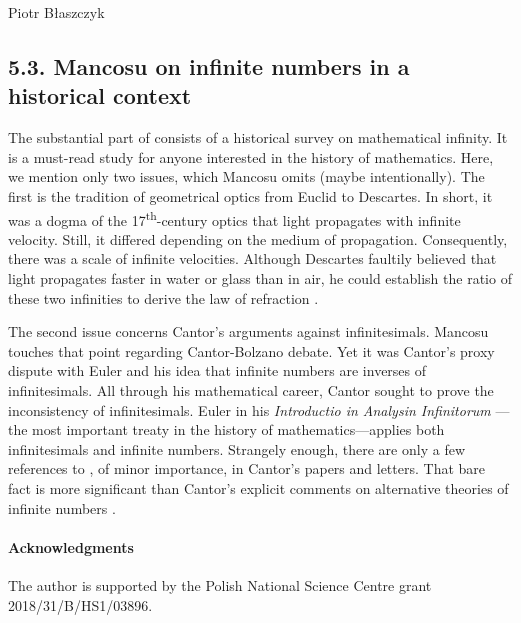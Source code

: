 \begin{artengenv}{Piotr Błaszczyk}
\subsection{5.3. Mancosu on infinite numbers in a historical context}

The substantial part of \parencite{ref_pm09} consists of a historical survey on mathematical infinity. It is a must-read study for anyone interested in the history of mathematics.  Here, we mention only two issues, which Mancosu omits (maybe intentionally). The first is the tradition of geometrical optics from Euclid to Descartes. In short, it was a dogma of the 17\textsuperscript{th}-century optics that light propagates with infinite velocity. Still, it differed depending on the medium of propagation. 
Consequently, there
was a scale of infinite velocities. Although Descartes faultily believed that light propagates
faster in water or glass than in air, he could establish the ratio of these two
infinities to derive the law of refraction \parencite[see][]{ref_pb20}.

The second issue concerns Cantor's arguments against infinitesimals. Mancosu touches that point regarding Cantor-Bolzano debate. Yet it was Cantor's proxy dispute with Euler and his idea that infinite numbers are inverses of infinitesimals. 
All through his mathematical career, Cantor sought to prove the inconsistency of infinitesimals. Euler in his \textit{Introductio in Analysin Infinitorum} \parencite*{ref_LE48}---the most important treaty in the history of
mathematics---applies both infinitesimals and infinite numbers. Strangely enough, there are only a few references to \parencite{ref_LE48}, of minor importance, in Cantor's papers and letters. 
That bare fact is more significant than Cantor's explicit comments on alternative theories of infinite numbers \parencite[see][]{ref_bf}.

\paragraph{Acknowledgments}
The author is supported by the Polish National Science Centre grant 2018/31/B/HS1/03896.


\end{artengenv}
